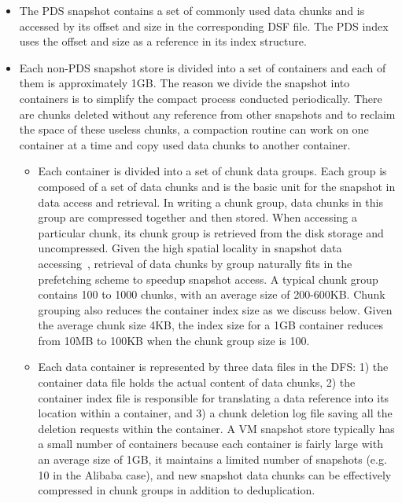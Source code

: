 \begin{itemize}
\item The PDS snapshot contains a set of commonly used data chunks and is accessed by its offset and size
in the corresponding DSF file.
The PDS index uses the offset and size as a reference in its index structure.
 
\item Each non-PDS snapshot store is divided into a set of containers and each of them is approximately 
1GB. The reason we divide the snapshot into containers is to simplify the compact process
conducted periodically.  There are chunks deleted without any reference from other snapshots
and to reclaim the space of these useless chunks, a compaction  routine can work on one container at a time
and copy used data chunks to another container.
	\begin{itemize}
	\item Each container is divided into a set of chunk data groups. Each group is composed of
	a set of data chunks and is the basic unit for the snapshot in data access and retrieval. 
	In writing a chunk group, data chunks in this group are compressed together and then stored. 
	When accessing a particular chunk, its chunk group is retrieved from the disk storage
	and uncompressed. Given the high spatial locality 
in snapshot data accessing~\cite{Sampling,FoundationPaper},
	retrieval of  data chunks by group naturally fits in the prefetching scheme  to speedup
	snapshot access. A  typical chunk group contains 100 to 1000 chunks, with an average size of 
200-600KB.
Chunk grouping also reduces the  container index size as we discuss below. 
Given  the average chunk size  4KB,  the index size for a 1GB container reduces from 10MB to 100KB when
the chunk group size is 100.
	\item 
Each data container is represented by three data files in the DFS:
1) the container data file holds the actual content of data chunks, 
2) the container index file is responsible for translating a data reference
into its location within a container, and 
3) a chunk deletion log file saving all the deletion requests within  the container.
A VM snapshot store typically has a small number of containers because each container is fairly large with an average size of 1GB, it 
maintains a limited number of snapshots (e.g. 10 in the Alibaba case),
and new snapshot data chunks can be effectively compressed in chunk groups in addition to  deduplication.


\end{itemize}
\end{itemize}
